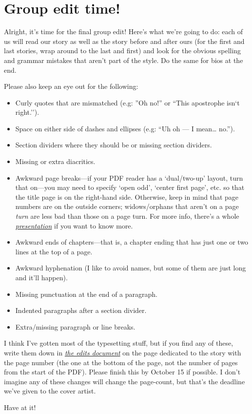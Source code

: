 \documentclass{memoir}
\begin{document}
\section*{Group edit time!}

Alright, it's time for the final group edit! Here's what we're going to do: each of us will read our story as well as the story before and after ours (for the first and last stories, wrap around to the last and first) and look for the obvious spelling and grammar mistakes that aren't part of the style. Do the same for bios at the end.

Please also keep an eye out for the following:

\begin{itemize}
  \item Curly quotes that are mismatched (e.g: ''Oh no!'' or ``This apostrophe isn`t right.'').
  \item Space on either side of dashes and ellipses (e.g: ``Uh oh --- I mean\ldots{} no.'').
  \item Section dividers where they should be or missing section dividers.
  \item Missing or extra diacritics.
\item Awkward page breaks---if your PDF reader has a `dual/two-up' layout, turn that on---you may need to specify `open odd', `center first page', etc. so that the title page is on the right-hand side. Otherwise, keep in mind that page numbers are on the outside corners; widows/orphans that aren't on a page \emph{turn} are less bad than those on a page turn. For more info, there's a whole \emph{\href{https://writing.drab-makyo.com/layout-and-design/}{presentation}} if you want to know more.
  \item Awkward ends of chapters---that is, a chapter ending that has just one or two lines at the top of a page.
  \item Awkward hyphenation (I like to avoid names, but some of them are just long and it'll happen).
  \item Missing punctuation at the end of a paragraph.
  \item Indented paragraphs after a section divider.
  \item Extra/missing paragraph or line breaks.
\end{itemize}

I think I've gotten most of the typesetting stuff, but if you find any of these, write them down in \emph{\href{https://docs.google.com/document/d/15Nxm2nm1xkqlmeFr-Nmw2E1KVGYrnD0w5vPffdfcRUU/edit}{the edits document}} on the page dedicated to the story with the page number (the one at the bottom of the page, not the number of pages from the start of the PDF). Please finish this by October 15 if possible. I don't imagine any of these changes will change the page-count, but that's the deadline we've given to the cover artist.

Have at it!
\end{document}
